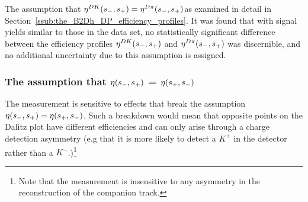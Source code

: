 The assumption that \texorpdfstring{$\eta^{{D}{K}}(s_-, s_+) = \eta^{{D}\pi}(s_-, s_+)$} was examined in detail in Section~\ref{ssub:the_B2Dh_DP_efficiency_profiles}. It was found that with signal yields similar to those in the data set, no statistically significant difference between the efficiency profiles $\eta^{{D}{K}}(s_-, s_+)$  and $\eta^{{D}\pi}(s_-, s_+)$ was discernible, and no additional uncertainty due to this assumption is assigned.

\subsubsection{The assumption that \texorpdfstring{$\eta(s_-, s_+)$}{eta(s-,s+)} = \texorpdfstring{$\eta(s_+, s_-)$}{eta(s+,s-)}}
\label{subs:eta_symmetry}


The measurement is sensitive to effects that break the assumption $\eta(s_-, s_+)=\eta(s_+, s_-)$. Such a breakdown would mean that opposite points on the Dalitz plot have different efficiencies and can only arise through a charge detection asymmetry (e.g that it is more likely to detect a $K^+$ in the detector rather than a $K^-$.)\footnote{Note that the measurement is insensitive to any asymmetry in the reconstruction of the companion track.}

